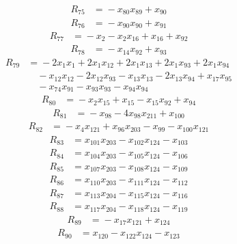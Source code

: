 \begin{align*}
R_{75}&={}-x_{80}x_{89} +x_{90}
\end{align*}
\begin{align*}
R_{76}&={}-x_{90}x_{90} +x_{91}
\end{align*}
\begin{align*}
R_{77}&={}-x_{2} -x_{2}x_{16} +x_{16} +x_{92}
\end{align*}
\begin{align*}
R_{78}&={}-x_{14}x_{92} +x_{93}
\end{align*}
\begin{align*}
R_{79}&={}-2x_{1}x_{1} +2x_{1}x_{12} +2x_{1}x_{13} +2x_{1}x_{93} +2x_{1}x_{94}\\
&\quad{}-x_{12}x_{12} -2x_{12}x_{93} -x_{13}x_{13} -2x_{13}x_{94} +x_{17}x_{95}\\
&\quad{}-x_{74}x_{91} -x_{93}x_{93} -x_{94}x_{94}
\end{align*}
\begin{align*}
R_{80}&={}-x_{2}x_{15} +x_{15} -x_{15}x_{92} +x_{94}
\end{align*}
\begin{align*}
R_{81}&={}-x_{98} -4x_{98}x_{211} +x_{100}
\end{align*}
\begin{align*}
R_{82}&={}-x_{4}x_{121} +x_{96}x_{203} -x_{99} -x_{100}x_{121}
\end{align*}
\begin{align*}
R_{83}&={}x_{101}x_{203} -x_{102}x_{124} -x_{103}
\end{align*}
\begin{align*}
R_{84}&={}x_{104}x_{203} -x_{105}x_{124} -x_{106}
\end{align*}
\begin{align*}
R_{85}&={}x_{107}x_{203} -x_{108}x_{124} -x_{109}
\end{align*}
\begin{align*}
R_{86}&={}x_{110}x_{203} -x_{111}x_{124} -x_{112}
\end{align*}
\begin{align*}
R_{87}&={}x_{113}x_{204} -x_{115}x_{124} -x_{116}
\end{align*}
\begin{align*}
R_{88}&={}x_{117}x_{204} -x_{118}x_{124} -x_{119}
\end{align*}
\begin{align*}
R_{89}&={}-x_{17}x_{121} +x_{124}
\end{align*}
\begin{align*}
R_{90}&={}x_{120} -x_{122}x_{124} -x_{123}
\end{align*}
